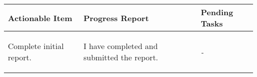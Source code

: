 \begin{table}[!h]
    \centering
    \begin{tabularx}{\textwidth}{|X|X|X|}
        \hline
        Actionable Item & Progress Report & Pending Tasks \\
        \hline
        \hline
        \begin{myitemize}
            \item Complete initial report.
        \end{myitemize} & 
        \begin{myitemize}
            \item I have completed and submitted the report.
        \end{myitemize} & 
        \begin{myitemize}
            \item \textit{-}
        \end{myitemize} \\
        \hline
    \end{tabularx}
\end{table}
